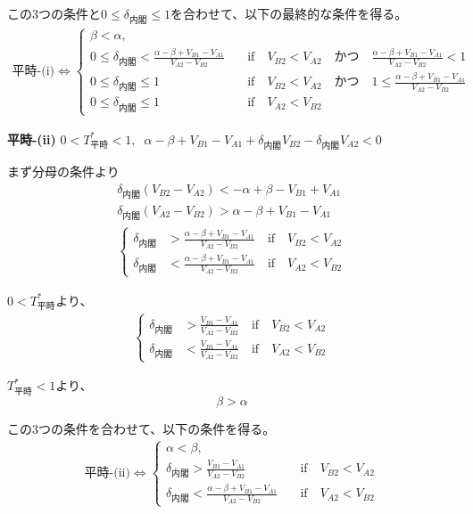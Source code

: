 \documentclass[main.tex]{subfiles}
\begin{document}
この3つの条件と$0 \le \delta_{内閣} \le 1$を合わせて、以下の最終的な条件を得る。
\begin{align*}
    \text{平時-(i)} \Leftrightarrow 
    \begin{cases}
        \beta < \alpha, \\
        0 \le \delta_{内閣} < \frac{\alpha-\beta + V_{B1}-V_{A1}}{V_{A2} - V_{B2}} \quad&\text{if}\quad V_{B2} < V_{A2} \quad{かつ}\quad \frac{\alpha-\beta + V_{B1}-V_{A1}}{V_{A2} - V_{B2}}<1\\
        0 \le \delta_{内閣} \le 1 \quad&\text{if}\quad V_{B2} < V_{A2} \quad{かつ}\quad 1 \le \frac{\alpha-\beta + V_{B1}-V_{A1}}{V_{A2} - V_{B2}}\\
        0 \le \delta_{内閣} \le 1 \quad&\text{if}\quad V_{A2} < V_{B2}
    \end{cases}
\end{align*}



\bigskip
\noindent
\textbf{平時-(ii)}\; $0<T^*_{平時}<1,\;\; \alpha-\beta + V_{B1}-V_{A1} + \delta_{内閣}V_{B2} - \delta_{内閣}V_{A2}　< 0$

まず分母の条件より
\begin{align*}
    \delta_{内閣}(V_{B2} - V_{A2}) < -\alpha+\beta - V_{B1}+V_{A1} \\
    \delta_{内閣}(V_{A2} - V_{B2}) > \alpha-\beta + V_{B1}-V_{A1}\\
    \begin{cases}
        \delta_{内閣} &> \frac{\alpha-\beta + V_{B1}-V_{A1}}{V_{A2} - V_{B2}} \quad\text{if}\quad V_{B2} < V_{A2}\\
        \delta_{内閣} &< \frac{\alpha-\beta + V_{B1}-V_{A1}}{V_{A2} - V_{B2}} \quad\text{if}\quad V_{A2} < V_{B2}
    \end{cases}
\end{align*}


$0<T^*_{平時}$より、
\begin{align*}
    \begin{cases}
        \delta_{内閣} &> \frac{V_{B1} - V_{A1}}{V_{A2} - V_{B2}} \quad\text{if}\quad V_{B2} < V_{A2}\\
        \delta_{内閣} &< \frac{V_{B1} - V_{A1}}{V_{A2} - V_{B2}} \quad\text{if}\quad V_{A2} < V_{B2}
      \end{cases}
\end{align*}

$T^*_{平時}<1$より、
$$\beta > \alpha$$

この3つの条件を合わせて、以下の条件を得る。
\begin{align*}
    \text{平時-(ii)} \Leftrightarrow 
    \begin{cases}
        \alpha < \beta, \\
        \delta_{内閣} > \frac{V_{B1} - V_{A1}}{V_{A2} - V_{B2}} \quad&\text{if}\quad V_{B2} < V_{A2}\\
        \delta_{内閣} < \frac{\alpha-\beta + V_{B1}-V_{A1}}{V_{A2} - V_{B2}} \quad&\text{if}\quad V_{A2} < V_{B2}
    \end{cases}
\end{align*}
\end{document}
